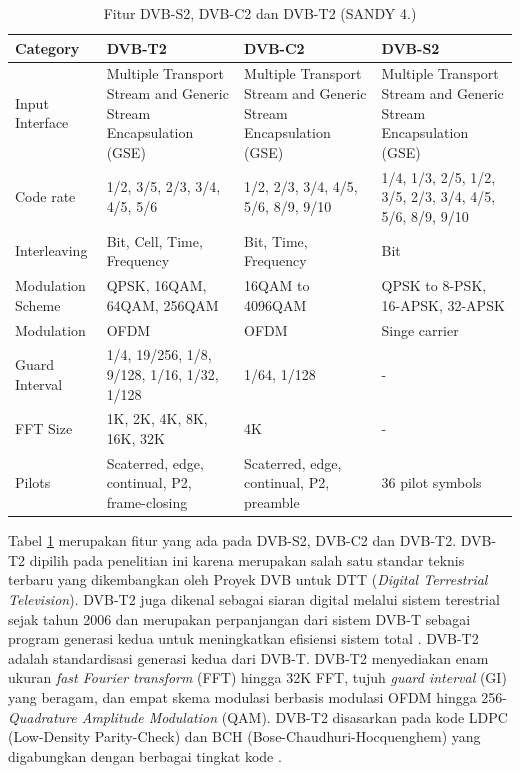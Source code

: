 \begin{singlespace}
	\begin{table}[H]
		\centering
		\caption{Fitur DVB-S2, DVB-C2 dan DVB-T2 (SANDY 4.)}
		\label{Fitur DVB-S2, DVB-C2 dan DVB-T2}
\begin{tabular}{|p{2cm}|p{3cm}|p{3cm}|p{3cm}|}
	\hline
	Category & DVB-T2 & DVB-C2 & DVB-S2 \\ \hline
	Input Interface & Multiple Transport Stream and Generic Stream   Encapsulation (GSE) & Multiple Transport Stream and Generic Stream   Encapsulation (GSE) & Multiple Transport Stream and Generic Stream   Encapsulation (GSE) \\ \hline
	Code rate & 1/2, 3/5, 2/3, 3/4, 4/5, 5/6 & 1/2, 2/3, 3/4, 4/5, 5/6, 8/9, 9/10 & 1/4, 1/3, 2/5, 1/2, 3/5, 2/3, 3/4, 4/5, 5/6, 8/9, 9/10 \\ \hline
	Interleaving & Bit, Cell, Time, Frequency & Bit, Time, Frequency & Bit \\ \hline
	Modulation Scheme & QPSK, 16QAM, 64QAM, 256QAM & 16QAM to 4096QAM & QPSK to 8-PSK, 16-APSK, 32-APSK \\ \hline
	Modulation & OFDM & OFDM & Singe carrier \\ \hline
	Guard Interval & 1/4, 19/256, 1/8, 9/128, 1/16, 1/32, 1/128 & 1/64, 1/128 & - \\ \hline
	FFT Size & 1K, 2K, 4K, 8K, 16K, 32K & 4K & - \\ \hline
	Pilots & Scaterred, edge, continual, P2, frame-closing & Scaterred, edge, continual, P2, preamble & 36 pilot symbols \\ \hline
\end{tabular}
	\end{table}
\end{singlespace}

Tabel \ref{Fitur DVB-S2, DVB-C2 dan DVB-T2} merupakan fitur yang ada pada DVB-S2, DVB-C2 dan DVB-T2. DVB-T2 dipilih pada penelitian ini karena merupakan salah satu standar teknis terbaru yang dikembangkan oleh Proyek DVB untuk DTT (\textit{Digital Terrestrial Television}). DVB-T2 juga dikenal sebagai siaran digital melalui sistem terestrial sejak tahun 2006 dan merupakan perpanjangan dari sistem DVB-T sebagai program generasi kedua untuk meningkatkan efisiensi sistem total \citep{Yaacob2019}. DVB-T2 adalah standardisasi generasi kedua dari DVB-T. DVB-T2 menyediakan enam ukuran  \textit{fast Fourier transform} (FFT) hingga 32K FFT, tujuh  \textit{guard interval} (GI) yang beragam, dan empat skema modulasi berbasis modulasi OFDM hingga 256-\textit{Quadrature Amplitude Modulation} (QAM). DVB-T2 disasarkan pada kode LDPC (Low-Density Parity-Check) dan BCH (Bose-Chaudhuri-Hocquenghem) yang digabungkan dengan berbagai tingkat kode \citep{Lee2019}. 

